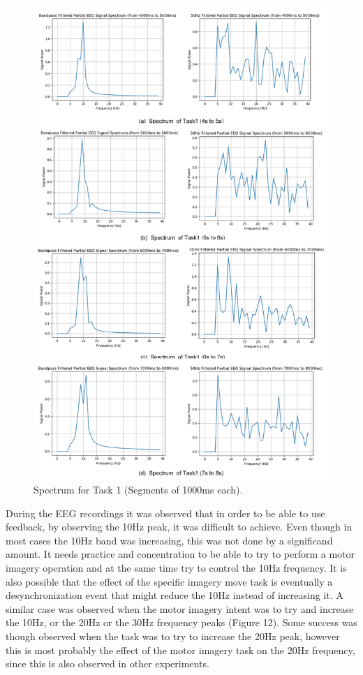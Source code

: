 \begin{figure}%
	\centering
	\includegraphics[width=\linewidth]{Figures/task1_10Hz.jpg} 
	\caption{Spectrum for Task 1 (Segments of 1000ms each).} 
	\label{task1_10} 
\end{figure}


During the EEG recordings it was observed that in order to be able to use feedback, by observing the 10Hz peak, it was difficult to achieve. Even though in most cases the 10Hz band was increasing, this was not done by a significand amount. It needs practice and concentration to be able to try to perform a motor imagery operation and at the same time try to control the 10Hz frequency. It is also possible that the effect of the specific imagery move task is eventually a desynchronization event that might reduce the 10Hz instead of increasing it.  A similar case was observed when the motor imagery intent was to try and increase the 10Hz, or the 20Hz or the 30Hz frequency peaks (Figure 12). Some success was though observed when the task was to try to increase the 20Hz peak, however this is most probably the effect of the motor imagery task on the 20Hz frequency, since this is also observed in other experiments. 


